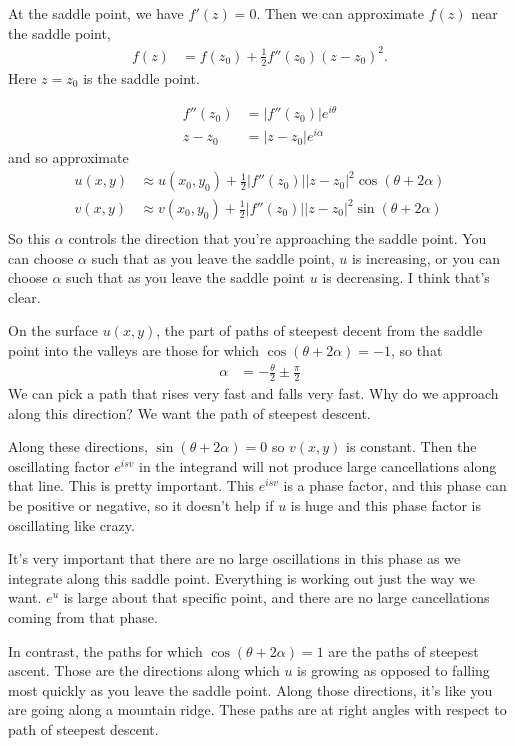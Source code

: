 At the saddle point, we have
$f'(z) = 0$.
Then we can approximate $f(z)$ near the saddle point,
\begin{align}
    f(z) &=
    f(z_0)
    + \frac{1}{2} f''(z_0){(z - z_0)}^2.
\end{align}
Here $z=z_0$ is the saddle point.

\begin{align}
    f''(z_0) &= |f''(z_0)| e^{i\theta}\\
    z - z_0 &= |z - z_0| e^{i\alpha}
\end{align}
and so approximate
\begin{align}
    u(x, y) &\approx
    u(x_0, y_0) + \frac{1}{2}|f''(z_0)|
    |z - z_0|^2 \cos(\theta + 2\alpha)\\
    v(x, y) &\approx
    v(x_0, y_0) + \frac{1}{2}|f''(z_0)|
    |z - z_0|^2 \sin(\theta + 2\alpha)\\
\end{align}
So this $\alpha$ controls the direction that you're approaching the saddle
point.
You can choose $\alpha$ such that as you leave the saddle point,
$u$ is increasing,
or you can choose $\alpha$ such that as you leave the saddle point
$u$ is decreasing.
I think that's clear.

On the surface $u(x, y)$,
the part of paths of steepest decent from the saddle point
into the valleys are those for which $\cos(\theta + 2\alpha)=-1$,
so that
\begin{align}
    \alpha &= - \frac{\theta}{2} \pm \frac{\pi}{2}
\end{align}
We can pick a path that rises very fast and falls very fast.
Why do we approach along this direction?
We want the path of steepest descent.

Along these directions,
$\sin(\theta + 2\alpha)=0$
so $v(x, y)$ is constant.
Then the oscillating factor $e^{isv}$
in the integrand will not produce large cancellations
along that line.
This is pretty important.
This $e^{isv}$ is a phase factor,
and this phase can be positive or negative,
so it doesn't help if $u$ is huge and this phase factor is
oscillating like crazy.

It's very important that  there are no large oscillations in this phase as we
integrate along this saddle point.
Everything is working out just the way we want.
$e^{u}$ is large about that specific point,
and there are no large cancellations coming from that phase.

In contrast,
the paths for which
$\cos(\theta + 2\alpha)=1$
are the paths of steepest ascent.
Those are the directions along which $u$ is growing as opposed to falling
most quickly as you leave the saddle point.
Along those directions,
it's like you are going along a mountain ridge.
These paths are at right angles with respect to path of steepest descent.

